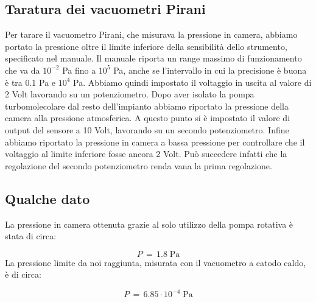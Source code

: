 \subsection{Taratura dei vacuometri Pirani}

Per tarare il vacuometro Pirani, che misurava la pressione in camera, abbiamo portato la pressione oltre il limite inferiore
della sensibilità dello strumento, specificato nel manuale. Il manuale riporta un range massimo di funzionamento che va da $10^{-2}$ \si{\pascal} fino a $10^5$ \si{\pascal}, anche se l'intervallo in cui la precisione è buona è tra 0.1 \si{\pascal} e $10^4$ \si{\pascal}. Abbiamo quindi impostato il voltaggio in uscita al valore di 2 Volt lavorando su un potenziometro. Dopo aver isolato la pompa turbomolecolare dal resto dell'impianto abbiamo riportato la pressione della camera alla pressione atmosferica. A questo punto si è impostato il valore di output del sensore a 10 Volt, lavorando su un secondo potenziometro. Infine abbiamo riportato la pressione in camera a bassa pressione per controllare che il voltaggio al limite inferiore fosse ancora 2 Volt. Può succedere infatti che la regolazione del secondo potenziometro renda vana la prima regolazione.

\subsection{Qualche dato}

La pressione in camera ottenuta grazie al solo utilizzo della pompa rotativa è stata di circa:

\begin{equation}
    P \,=\, 1.8  \; \si{\pascal}
\end{equation}
%
La pressione limite da noi raggiunta, misurata con il vacuometro a catodo caldo, è di circa:

\begin{equation}
    P \,=\, 6.85 \cdot 10^{-4} \; \si{\pascal}
\end{equation}

